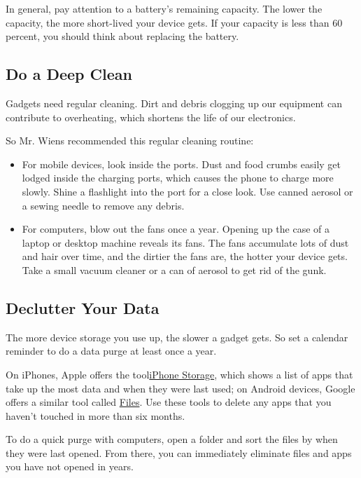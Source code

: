 In general, pay attention to a battery's remaining capacity. The lower
the capacity, the more short-lived your device gets. If your capacity is
less than 60 percent, you should think about replacing the battery.

\hypertarget{do-a-deep-clean}{%
\subsection{Do a Deep Clean}\label{do-a-deep-clean}}

Gadgets need regular cleaning. Dirt and debris clogging up our equipment
can contribute to overheating, which shortens the life of our
electronics.

So Mr. Wiens recommended this regular cleaning routine:

\begin{itemize}
\item
  For mobile devices, look inside the ports. Dust and food crumbs easily
  get lodged inside the charging ports, which causes the phone to charge
  more slowly. Shine a flashlight into the port for a close look. Use
  canned aerosol or a sewing needle to remove any debris.
\item
  For computers, blow out the fans once a year. Opening up the case of a
  laptop or desktop machine reveals its fans. The fans accumulate lots
  of dust and hair over time, and the dirtier the fans are, the hotter
  your device gets. Take a small vacuum cleaner or a can of aerosol to
  get rid of the gunk.
\end{itemize}

\hypertarget{declutter-your-data}{%
\subsection{Declutter Your Data}\label{declutter-your-data}}

The more device storage you use up, the slower a gadget gets. So set a
calendar reminder to do a data purge at least once a year.

On iPhones, Apple offers the
tool\href{https://support.apple.com/en-us/HT201656}{iPhone Storage},
which shows a list of apps that take up the most data and when they were
last used; on Android devices, Google offers a similar tool called
\href{https://play.google.com/store/apps/details?id=com.google.android.apps.nbu.files\&hl=en_US}{Files}.
Use these tools to delete any apps that you haven't touched in more than
six months.

To do a quick purge with computers, open a folder and sort the files by
when they were last opened. From there, you can immediately eliminate
files and apps you have not opened in years.

